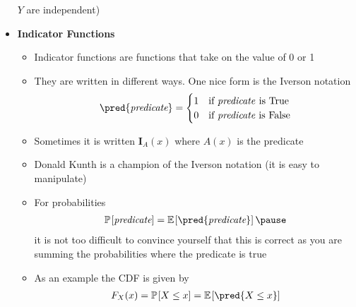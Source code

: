 \documentclass[11pt]{article}
\newcommand{\av}[2][]{\mathbb{E}_{#1\!}\left[ #2 \right]}
\newcommand{\Prob}[2][]{\mathbb{P}_{#1\!}\left[ #2 \right]}
\begin{document}
\begin{itemize}
\(Y\) are independent)
\item \textbf{Indicator Functions}
\begin{itemize}
\item Indicator functions are functions that take on the value of 0 or 1
\item They are written in different ways.  One nice form is the
Iverson notation
 \begin{align*}
   \pred{\text{\it predicate}} =
   \begin{cases}
     1 & \text{if \textit{predicate }is True}\\
     0 & \text{if \textit{predicate} is False}
   \end{cases}
\end{align*}
\item Sometimes it is written \(\bm{I}_A(x)\) where \(A(x)\) is the predicate
\item Donald Kunth is a champion of the Iverson notation (it is easy
to manipulate)
\item For probabilities
\begin{align*}
  \Prob{\text{\it predicate}} = \av{\pred{\text{\it predicate}}}\pause
\end{align*}
it is not too difficult to convince yourself that this is
correct as you are summing the probabilities where the predicate
is true
\item As an example the CDF is given by
\begin{align*}
  F_X(x) = \Prob{X\leq x} = \av{\pred{X\leq x}}
\end{align*}
\end{itemize}
\end{itemize}
\end{document}
